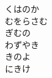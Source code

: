\documentclass[10pt,b5j]{tarticle} %
\begin{document}
\begin{enumerate}
\begin{minipage}[c]{\blocksize}
        \vspace{\linespace}
        \item
        くはのか\\
        むをらさむ\\
        ぎむの\\
        わずやき\\
        きのよ\\
        にきけ
    
    \end{minipage}
\end{enumerate} %
\end{document}
